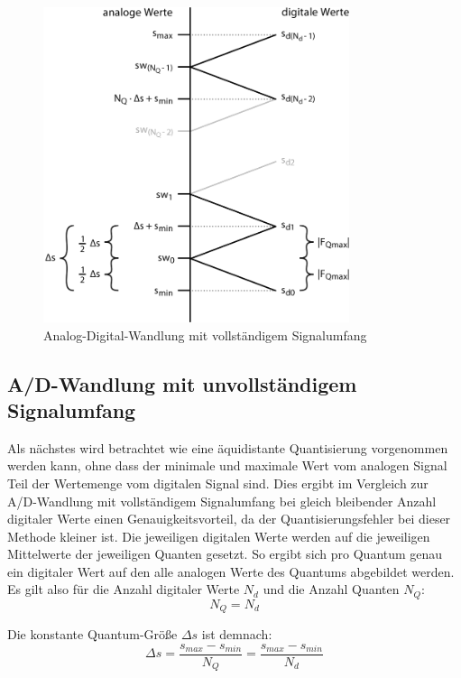 \documentclass[11pt,a4paper]{scrreprt}
\begin{document}
\begin{figure}[htbp] %
	\centering
	\includegraphics[width=0.8\textwidth]{AD-Wandl_vollst_Sig-Umf_ohne_delta.png}
	\caption{Analog-Digital-Wandlung mit vollständigem Signalumfang}
	\label{AD-Wandl_vollst_Sig-Umf_ohne_delta}
\end{figure}

\subsection{A/D-Wandlung mit unvollständigem Signalumfang}
Als nächstes wird betrachtet wie eine äquidistante Quantisierung vorgenommen werden kann, ohne dass der minimale und maximale Wert vom analogen Signal Teil der Wertemenge vom digitalen Signal sind. Dies ergibt im Vergleich zur A/D-Wandlung mit vollständigem Signalumfang bei gleich bleibender Anzahl digitaler Werte einen Genauigkeitsvorteil, da der Quantisierungsfehler bei dieser Methode kleiner ist.
Die jeweiligen digitalen Werte werden auf die jeweiligen Mittelwerte der jeweiligen Quanten gesetzt. So ergibt sich pro Quantum genau ein digitaler Wert auf den alle analogen Werte des Quantums abgebildet werden. Es gilt also für die Anzahl digitaler Werte $N_d$ und die Anzahl Quanten $N_Q$:
\[ 
	N_Q = N_d
\]

Die konstante Quantum-Größe $\Delta s$ ist demnach:
\[ 
	\Delta s = \frac { s_{max} - s_{min} } { N_Q } 
	         = \frac { s_{max} - s_{min} } { N_d }
\]
\end{document}
